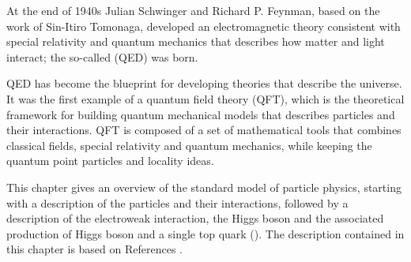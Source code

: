 
At the end of 1940s Julian Schwinger\cite{schwinger} and Richard P. Feynman\cite{feynman}, based on the work of Sin-Itiro Tomonaga\cite{tomonaga}, developed an electromagnetic theory consistent with special relativity and quantum mechanics that describes how matter and light interact; the so-called  (QED) was born.%

QED has become the blueprint for developing theories that describe the universe. It was the first example of a quantum field theory (QFT), which is the theoretical framework for building quantum mechanical models that describes particles and their interactions. QFT is composed of a set of mathematical tools that combines classical fields, special relativity and quantum mechanics, while keeping the quantum point particles and locality ideas.

This chapter gives an overview of the standard model of particle physics, starting with a description of the particles and their interactions, followed by a description of the electroweak interaction, the Higgs boson and the associated production of Higgs boson and a single top quark (\tH). The description contained in this chapter is based on References \cite{griffiths, mandl, halzen}.  %

